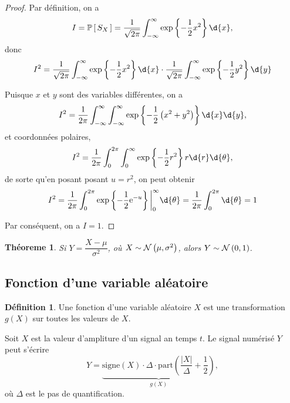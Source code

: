 \documentclass[11pt]{article}
\makeatletter
\renewcommand\P[1]{%
	\ensuremath{%
		\mathbb{P}\left[\,#1\,\right]%
	}%
}%
\newcommand\e{%
	\ensuremath{%
		\mathrm{e}%
	}%
}%
\newcommand\Norm[2]{%
	\ensuremath{%
		\mathcal{N}\left(#1,#2\right)%
	}%
}%
\newtheorem{theoreme}{Théoreme}[section]
\theoremstyle{remark}
\theoremstyle{definition}
\newtheorem*{@definition}{Définition}
\newenvironment{definition}{%
	\begin{@definition}%
}{%
	\end{@definition}%
	\setcounter{property}{0}%
}
\makeatother
\begin{document}
\begin{proof}
	Par définition, on a
	\begin{equation*}
		I
		=\P{S_X}
		=\frac{1}{\sqrt{2\pi}}\int_{-\infty}^\infty\exp
			\left\{-\frac{1}{2}x^2\right\}\d{x},
	\end{equation*}
	donc
	\begin{equation*}
		I^2
		=\frac{1}{\sqrt{2\pi}}\int_{-\infty}^\infty\exp
			\left\{-\frac{1}{2}x^2\right\}\d{x}\cdot
			\frac{1}{\sqrt{2\pi}}\int_{-\infty}^\infty\exp
			\left\{-\frac{1}{2}y^2\right\}\d{y}
	\end{equation*}

	Puisque $x$ et $y$ sont des variables différentes, on a
	\begin{equation*}
		I^2
		=\frac{1}{2\pi}\int_{-\infty}^\infty\int_{-\infty}^\infty
			\exp\left\{-\frac{1}{2}\left(x^2+y^2\right)\right\}\d{x}\d{y},
	\end{equation*}
	et coordonnées polaires, 
	\begin{equation*}
		I^2
		=\frac{1}{2\pi}\int_0^{2\pi}\int_0^\infty
			\exp\left\{-\frac{1}{2}r^2\right\}r\d{r}\d{\theta},
	\end{equation*}
	de sorte qu'en posant posant $u=r^2$, on peut obtenir
	\begin{equation*}
		I^2
		=\frac{1}{2\pi}\int_0^{2\pi}
			\exp\left\{-\frac{1}{2}\e^{-u}\right\}\bigg\rvert_0^\infty
			\d{\theta}
		=\frac{1}{2\pi}\int_0^{2\pi}\d{\theta}
		=1
	\end{equation*}
	
	Par conséquent, on a $I=1$.
\end{proof}

\begin{theoreme}
	Si $Y=\dfrac{X-\mu}{\sigma^2}$, où $X\sim\Norm{\mu}{\sigma^2}$, alors
	$Y\sim\Norm{0}{1}$.
\end{theoreme}

\subsection{Fonction d'une variable aléatoire}
\begin{definition}
	Une fonction d'une variable aléatoire $X$ est une transformation $g(X)$ sur
	toutes les valeurs de $X$.
\end{definition}

\begin{exemple}
	Soit $X$ est la valeur d'ampliture d'un signal an temps $t$. Le signal
	numérisé $Y$ peut s'écrire\vspace{-2mm}
	\begin{equation*}
		Y
		=\underbrace{\mathrm{signe}(X)\cdot\Delta\cdot\mathrm{part}\left(
			\frac{|X|}{\Delta}+\frac{1}{2}
		\right)}_{g(X)},
	\end{equation*}
	où $\Delta$ est le pas de quantification.
\end{exemple}
\end{document}
